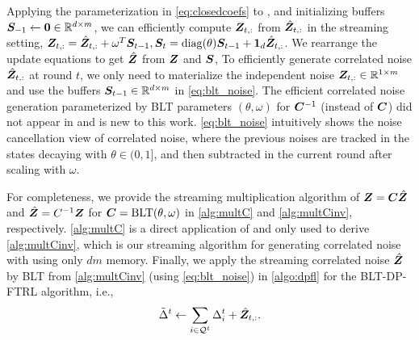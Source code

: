 Applying the parameterization in \cref{eq:closedcoefs}  to \citep[Alg 1]{mcmahan2024efficient}, and initializing buffers ${\bm{S}}_{-1} \gets \mathbf{0} \in \mathbb{R}^{d \times m}$, we can efficiently compute ${\bm{Z}}_{t,:}$ from $\hat{{\bm{Z}}}_{t,:}$ in the streaming setting,
  $
  {\bm{Z}}_{t,:} = \hat{{\bm{Z}}}_{t,:} + \omega^T {\bm{S}}_{t-1}, 
  {\bm{S}}_{t} = \operatorname{diag}(\theta) {\bm{S}}_{t-1}  + \bm{1}_d \hat{{\bm{Z}}}_{t,:}
  $. We rearrange the update equations to get $\hat{{\bm{Z}}}$ from ${\bm{Z}}$ and ${\bm{S}}$, 
  To efficiently generate correlated noise $\hat{{\bm{Z}}}_{t,:}$ at round $t$, we only need to materialize the independent noise ${\bm{Z}}_{t,:} \in \mathbb{R}^{1 \times m}$ and use the buffers ${\bm{S}}_{t-1} \in \mathbb{R}^{d \times m}$ in \cref{eq:blt_noise}. The efficient correlated noise generation parameterized by BLT parameters $(\theta, \omega)$ for ${\bm{C}}^{-1}$ (instead of ${\bm{C}}$) did not appear in \citet{mcmahan2024efficient} and is new to this work. \cref{eq:blt_noise} intuitively shows the noise cancellation view of correlated noise, where the previous noises are tracked in the states decaying with $\theta \in (0, 1]$, and then subtracted in the current round after scaling with $\omega$. 
  
  For completeness, we provide the streaming multiplication algorithm of ${\bm{Z}} = {\bm{C}} \hat {{\bm{Z}}}$ and $\hat {{\bm{Z}}} = C^{-1} {\bm{Z}}$ for ${\bm{C}} = \text{BLT}(\theta, \omega)$ in \cref{alg:multC} and \cref{alg:multCinv}, respectively. 
  \cref{alg:multC} is a direct application of \citep[Alg 1]{mcmahan2024efficient} and only used to derive \cref{alg:multCinv}, which is our streaming algorithm for generating correlated noise with \blts using only $dm$ memory. 
  Finally, we apply the streaming correlated noise $\hat{{\bm{Z}}}$ by BLT from \cref{alg:multCinv} (using \cref{eq:blt_noise})  in \cref{algo:dpfl} for the BLT-DP-FTRL algorithm, i.e., 
  \begin{equation}
      \tilde{\Delta}^t \leftarrow \sum_{i \in \mathcal{Q}^t} \Delta^{t}_i + \hat{{\bm{Z}}}_{t,:}.
  \end{equation}

 

